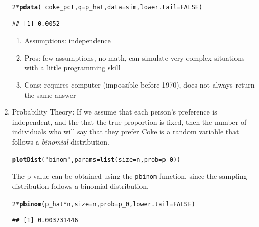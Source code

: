 \documentclass[10pt]{article}\usepackage[]{graphicx}\usepackage[]{color}
\makeatletter
\newcommand{\hlnum}[1]{\textcolor[rgb]{0.686,0.059,0.569}{#1}}%
\newcommand{\hlstr}[1]{\textcolor[rgb]{0.192,0.494,0.8}{#1}}%
\newcommand{\hlopt}[1]{\textcolor[rgb]{0,0,0}{#1}}%
\newcommand{\hlstd}[1]{\textcolor[rgb]{0.345,0.345,0.345}{#1}}%
\newcommand{\hlkwc}[1]{\textcolor[rgb]{0.333,0.667,0.333}{#1}}%
\newcommand{\hlkwd}[1]{\textcolor[rgb]{0.737,0.353,0.396}{\textbf{#1}}}%
\newenvironment{kframe}{%
 \def\at@end@of@kframe{}%
 \ifinner\ifhmode%
  \def\at@end@of@kframe{\end{minipage}}%
  \begin{minipage}{\columnwidth}%
 \fi\fi%
 \def\FrameCommand##1{\hskip\@totalleftmargin \hskip-\fboxsep
 \colorbox{shadecolor}{##1}\hskip-\fboxsep
     \hskip-\linewidth \hskip-\@totalleftmargin \hskip\columnwidth}%
 \MakeFramed {\advance\hsize-\width
   \@totalleftmargin\z@ \linewidth\hsize
   \@setminipage}}%
 {\par\unskip\endMakeFramed%
 \at@end@of@kframe}
\newenvironment{knitrout}{}{} %
\newcommand{\cmd}[1]{\texttt{#1}}
\makeatother
\begin{document}
\begin{enumerate}
\begin{knitrout}
\color{fgcolor}\begin{kframe}
\begin{alltt}
\hlnum{2} \hlopt{*} \hlkwd{pdata}\hlstd{(}\hlopt{~} \hlstd{coke_pct,} \hlkwc{q} \hlstd{= p_hat,} \hlkwc{data} \hlstd{= sim,} \hlkwc{lower.tail} \hlstd{=} \hlnum{FALSE}\hlstd{)}
\end{alltt}
\begin{verbatim}
## [1] 0.0052
\end{verbatim}
\end{kframe}
\end{knitrout}
  
 \begin{enumerate}
    \item Assumptions: independence
    \item Pros: few assumptions, no math, can simulate very complex situations with a little programming skill
    \item Cons: requires computer (impossible before 1970), does not always return the same answer
  \end{enumerate}  
  
\clearpage  
\item Probability Theory: If we assume that each person's preference is independent, and the that the true proportion is fixed, then the number of individuals who will say that they prefer Coke is a random variable that follows a \emph{binomial} distribution. 

\vfill


  
\begin{knitrout}
\color{fgcolor}\begin{kframe}
\begin{alltt}
\hlkwd{plotDist}\hlstd{(}\hlstr{"binom"}\hlstd{,} \hlkwc{params} \hlstd{=} \hlkwd{list}\hlstd{(}\hlkwc{size} \hlstd{= n,} \hlkwc{prob} \hlstd{= p_0))}
\end{alltt}
\end{kframe}
\end{knitrout}

The p-value can be obtained using the \cmd{pbinom} function, since the sampling distribution follows a binomial distribution.

\begin{knitrout}
\color{fgcolor}\begin{kframe}
\begin{alltt}
\hlnum{2} \hlopt{*} \hlkwd{pbinom}\hlstd{(p_hat} \hlopt{*} \hlstd{n,} \hlkwc{size} \hlstd{= n,} \hlkwc{prob} \hlstd{= p_0,} \hlkwc{lower.tail} \hlstd{=} \hlnum{FALSE}\hlstd{)}
\end{alltt}
\begin{verbatim}
## [1] 0.003731446
\end{verbatim}
\end{kframe}
\end{knitrout}


\end{enumerate}
\end{document}
